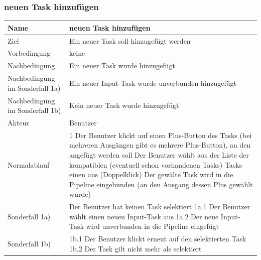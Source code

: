 \documentclass[a4paper,12pt]{scrartcl}
\begin{document}
\subsubsection{neuen Task hinzufügen}
\begin{center}
\begin{tabular}{|p{5cm}|p{10cm}|}
\hline Name & \textbf{neuen Task hinzufügen} \\ 
\hline Ziel & Ein neuer Task soll hinzugefügt werden \\ 
\hline Vorbedingung& keine \\
\hline Nachbedingung & Ein neuer Task wurde hinzugefügt \\ 
\hline Nachbedingung im Sonderfall 1a) & Ein neuer Input-Task wurde unverbunden hinzugefügt\\
\hline Nachbedingung im Sonderfall 1b) & Kein neuer Task wurde hinzugefügt\\
\hline Akteur & Benutzer \\ 
\hline Normalablauf & 1 Der Benutzer klickt auf einen Plus-Button des Tasks (bei mehreren Ausgängen gibt es mehrere Plus-Button), an den angefügt werden soll
\newline 2 Der Benutzer wählt aus der Liste der kompatiblen (eventuell schon vorhandenen Tasks) Tasks einen aus (Doppelklick)
\newline 3 Der gewälte Task wird in die Pipeline eingebunden (an den Ausgang dessen Plus gewählt wurde)\\ 
\hline Sonderfall 1a) & Der Benutzer hat keinen Task selektiert
\newline 1a.1 Der Benutzer wählt einen neuen Input-Task aus
\newline 1a.2 Der neue Input-Task wird unverbunden in die Pipeline eingefügt\\
\hline Sonderfall 1b) & 1b.1 Der Benutzer klickt erneut auf den selektierten Task
\newline 1b.2 Der Task gilt nicht mehr als selektiert\\
\hline
\end{tabular}
\end{center}
\end{document}
